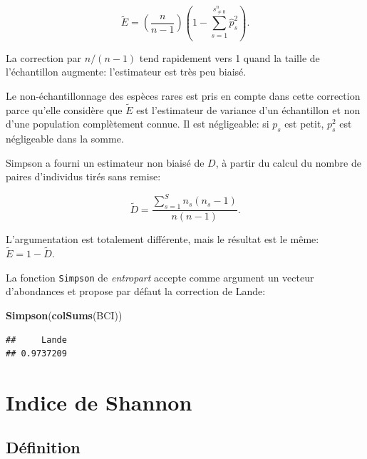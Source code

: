 \documentclass[
  11pt,
  french,
  a4paper,
  extrafontsizes,onecolumn,openright
  ]{memoir}
\newenvironment{Shaded}{\begin{snugshade}}{\end{snugshade}}
\newcommand{\KeywordTok}[1]{\textcolor[rgb]{0.13,0.29,0.53}{\textbf{#1}}}
\newcommand{\NormalTok}[1]{#1}
\begin{document}
\begin{equation} 
  \label{eq:BiaisSimpson}
  \tilde{E} = \left(\frac{n}{n-1}\right)\left(1-\sum^{s^{n}_{\ne 0}}_{s=1}{{\hat{p}}^2_s}\right).
\end{equation}

La correction par \({n}/{\left(n-1\right)}\) tend rapidement vers 1 quand la taille de l'échantillon augmente: l'estimateur est très peu biaisé.

Le non-échantillonnage des espèces rares est pris en compte dans cette correction parce qu'elle considère que \(\tilde{E}\) est l'estimateur de variance d'un échantillon et non d'une population complètement connue.
Il est négligeable: si \(p_s\) est petit, \(p^2_s\) est négligeable dans la somme.

Simpson a fourni un estimateur non biaisé de \(D\), à partir du calcul du nombre de paires d'individus tirés sans remise:

\begin{equation}
  \label{eq:EstSimpson1949}
  \tilde{D} = \frac{\sum^{S}_{s=1}{n_s\left(n_s -1\right)}}{n\left(n-1\right)}.
\end{equation}

L'argumentation est totalement différente, mais le résultat est le même: \(\tilde{E}=1-\tilde{D}\).

La fonction \texttt{Simpson} de \emph{entropart} accepte comme argument un vecteur d'abondances et propose par défaut la correction de Lande:

\scriptsize

\begin{Shaded}
\begin{Highlighting}[]
\KeywordTok{Simpson}\NormalTok{(}\KeywordTok{colSums}\NormalTok{(BCI))}
\end{Highlighting}
\end{Shaded}

\begin{verbatim}
##     Lande 
## 0.9737209
\end{verbatim}

\normalsize

\hypertarget{indice-de-shannon}{%
\section{Indice de Shannon}\label{indice-de-shannon}}

\hypertarget{duxe9finition-1}{%
\subsection{Définition}\label{duxe9finition-1}}
\end{document}
